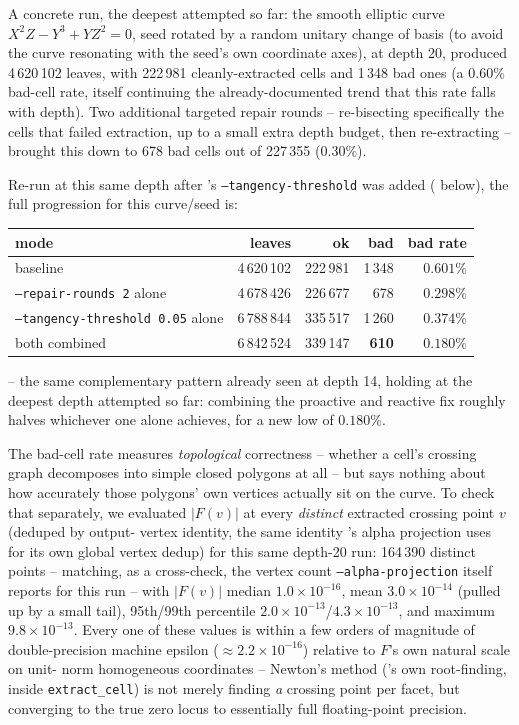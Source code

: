 \documentclass[11pt]{article}
\begin{document}
A concrete run, the deepest attempted so far: the smooth elliptic curve
$X^2Z-Y^3+YZ^2=0$, seed rotated by a random unitary change of basis (to
avoid the curve resonating with the seed's own coordinate axes), at depth
20, produced 4\,620\,102 leaves, with 222\,981 cleanly-extracted cells and
1\,348 bad ones (a $0.60\%$ bad-cell rate, itself continuing the
already-documented trend that this rate falls with depth). Two additional
targeted repair rounds -- re-bisecting specifically the cells that failed
extraction, up to a small extra depth budget, then re-extracting -- brought
this down to 678 bad cells out of 227\,355 ($0.30\%$).

Re-run at this same depth after 's
\texttt{--tangency-threshold} was added ( below),
the full progression for this curve/seed is:

\begin{center}
\begin{tabular}{@{}lrrrr@{}}
\toprule
mode & leaves & ok & bad & bad rate \\
\midrule
baseline & 4\,620\,102 & 222\,981 & 1\,348 & $0.601\%$ \\
\texttt{--repair-rounds 2} alone & 4\,678\,426 & 226\,677 & 678 & $0.298\%$ \\
\texttt{--tangency-threshold 0.05} alone & 6\,788\,844 & 335\,517 & 1\,260 & $0.374\%$ \\
both combined & 6\,842\,524 & 339\,147 & \textbf{610} & $\mathbf{0.180\%}$ \\
\bottomrule
\end{tabular}
\end{center}

-- the same complementary pattern already seen at depth 14, holding at
the deepest depth attempted so far: combining the proactive and reactive
fix roughly halves whichever one alone achieves, for a new low of
$0.180\%$.

The bad-cell rate measures \emph{topological} correctness -- whether a
cell's crossing graph decomposes into simple closed polygons at all -- but
says nothing about how accurately those polygons' own vertices actually
sit on the curve. To check that separately, we evaluated $|F(v)|$ at
every \emph{distinct} extracted crossing point $v$ (deduped by output-
vertex identity, the same identity 's alpha
projection uses for its own global vertex dedup) for this same depth-20
run: 164\,390 distinct points -- matching, as a cross-check, the vertex
count \texttt{--alpha-projection} itself reports for this run -- with
$|F(v)|$ median $1.0\times10^{-16}$, mean $3.0\times10^{-14}$ (pulled up
by a small tail), 95th/99th percentile $2.0\times10^{-13}$/$4.3\times
10^{-13}$, and maximum $9.8\times10^{-13}$. Every one of these values is
within a few orders of magnitude of double-precision machine epsilon
($\approx2.2\times10^{-16}$) relative to $F$'s own natural scale on unit-
norm homogeneous coordinates -- Newton's method ('s
own root-finding, inside \texttt{extract\_cell}) is not merely finding
\emph{a} crossing point per facet, but converging to the true zero locus
to essentially full floating-point precision.
\end{document}
